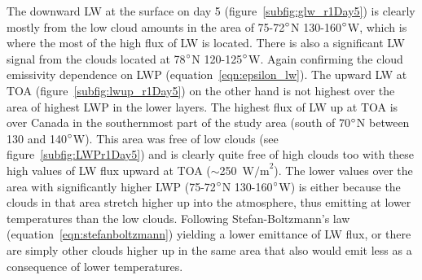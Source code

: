 The downward LW at the surface on day 5 (figure~\ref{subfig:glw_r1Day5}) is clearly mostly from the low cloud amounts in the area of 75-72$\degree$N 130-160$\degree$W, which is where the most of the high flux of LW is located. There is also a significant LW signal from the clouds located at 78$\degree$N 120-125$\degree$W. Again confirming the cloud emissivity dependence on LWP (equation~\ref{eqn:epsilon_lw}). The upward LW at TOA (figure~\ref{subfig:lwup_r1Day5}) on the other hand is not highest over the area of highest LWP in the lower layers. The highest flux of LW up at TOA is over Canada in the southernmost part of the study area (south of 70$\degree$N between 130 and 140$\degree$W). This area was free of low clouds (see figure~\ref{subfig:LWPr1Day5}) and is clearly quite free of high clouds too with these high values of LW flux upward at TOA ($\sim$250~$\text{W/m}^2$). The lower values over the area with significantly higher LWP (75-72$\degree$N 130-160$\degree$W) is either because the clouds in that area stretch higher up into the atmosphere, thus emitting at lower temperatures than the low clouds. Following Stefan-Boltzmann's law (equation~\ref{eqn:stefanboltzmann}) yielding a lower emittance of LW flux, or there are simply other clouds higher up in the same area that also would emit less as a consequence of lower temperatures.

